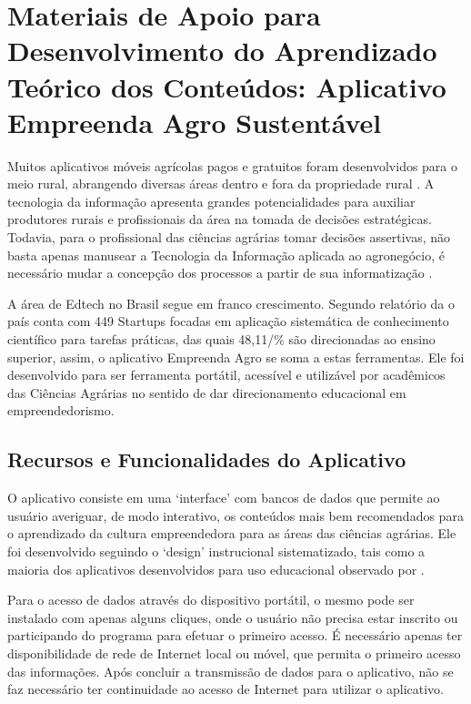 \section{Materiais de Apoio para Desenvolvimento do Aprendizado Teórico dos Conteúdos: Aplicativo Empreenda Agro Sustentável}

Muitos aplicativos móveis agrícolas pagos e gratuitos foram desenvolvidos para o meio rural, abrangendo diversas áreas dentro e fora da propriedade rural \cite{silva_environment_2015}. A tecnologia da informação apresenta grandes potencialidades para auxiliar produtores rurais e profissionais da área na tomada de decisões estratégicas. Todavia, para o profissional das ciências agrárias tomar decisões assertivas, não basta apenas manusear a Tecnologia da Informação aplicada ao agronegócio, é necessário mudar a concepção dos processos a partir de sua informatização \cite{ferraz_tecnologia_2017}.

A área de Edtech no Brasil segue em franco crescimento. Segundo relatório da  o país conta com 449 Startups focadas em aplicação sistemática de conhecimento científico para tarefas práticas, das quais 48,11/\% são direcionadas ao ensino superior, assim, o aplicativo Empreenda Agro se soma a estas ferramentas. Ele foi desenvolvido para ser ferramenta portátil, acessível e utilizável por acadêmicos das Ciências Agrárias no sentido de dar direcionamento educacional em empreendedorismo.

\subsection{Recursos e Funcionalidades do Aplicativo}

O aplicativo consiste em uma ‘interface’ com bancos de dados que permite ao usuário averiguar, de modo interativo, os conteúdos mais bem recomendados para o aprendizado da cultura empreendedora para as áreas das ciências agrárias. Ele foi desenvolvido seguindo o ‘design’ instrucional sistematizado, tais como a maioria dos aplicativos desenvolvidos para uso educacional observado por .

Para o acesso de dados através do dispositivo portátil, o mesmo pode ser instalado com apenas alguns cliques, onde o usuário não precisa estar inscrito ou participando do programa para efetuar o primeiro acesso. É necessário apenas ter disponibilidade de rede de Internet local ou móvel, que permita o primeiro acesso das informações. Após concluir a transmissão de dados para o aplicativo, não se faz necessário ter continuidade ao acesso de Internet para utilizar o aplicativo.


